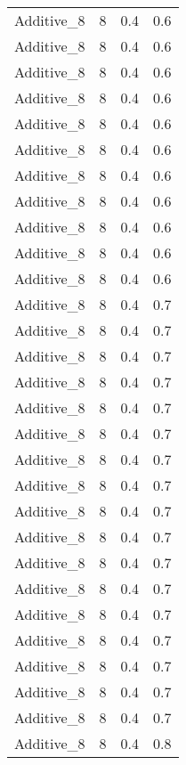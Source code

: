 \documentclass{article}
\begin{document}
\begin{longtable}[H]{lrrr}
 Additive\_8 &       8 &   0.4 &            0.6 \\
 Additive\_8 &       8 &   0.4 &            0.6 \\
 Additive\_8 &       8 &   0.4 &            0.6 \\
 Additive\_8 &       8 &   0.4 &            0.6 \\
 Additive\_8 &       8 &   0.4 &            0.6 \\
 Additive\_8 &       8 &   0.4 &            0.6 \\
 Additive\_8 &       8 &   0.4 &            0.6 \\
 Additive\_8 &       8 &   0.4 &            0.6 \\
 Additive\_8 &       8 &   0.4 &            0.6 \\
 Additive\_8 &       8 &   0.4 &            0.6 \\
 Additive\_8 &       8 &   0.4 &            0.6 \\
 Additive\_8 &       8 &   0.4 &            0.7 \\
 Additive\_8 &       8 &   0.4 &            0.7 \\
 Additive\_8 &       8 &   0.4 &            0.7 \\
 Additive\_8 &       8 &   0.4 &            0.7 \\
 Additive\_8 &       8 &   0.4 &            0.7 \\
 Additive\_8 &       8 &   0.4 &            0.7 \\
 Additive\_8 &       8 &   0.4 &            0.7 \\
 Additive\_8 &       8 &   0.4 &            0.7 \\
 Additive\_8 &       8 &   0.4 &            0.7 \\
 Additive\_8 &       8 &   0.4 &            0.7 \\
 Additive\_8 &       8 &   0.4 &            0.7 \\
 Additive\_8 &       8 &   0.4 &            0.7 \\
 Additive\_8 &       8 &   0.4 &            0.7 \\
 Additive\_8 &       8 &   0.4 &            0.7 \\
 Additive\_8 &       8 &   0.4 &            0.7 \\
 Additive\_8 &       8 &   0.4 &            0.7 \\
 Additive\_8 &       8 &   0.4 &            0.7 \\
 Additive\_8 &       8 &   0.4 &            0.8 \\

\end{longtable}
\end{document}
